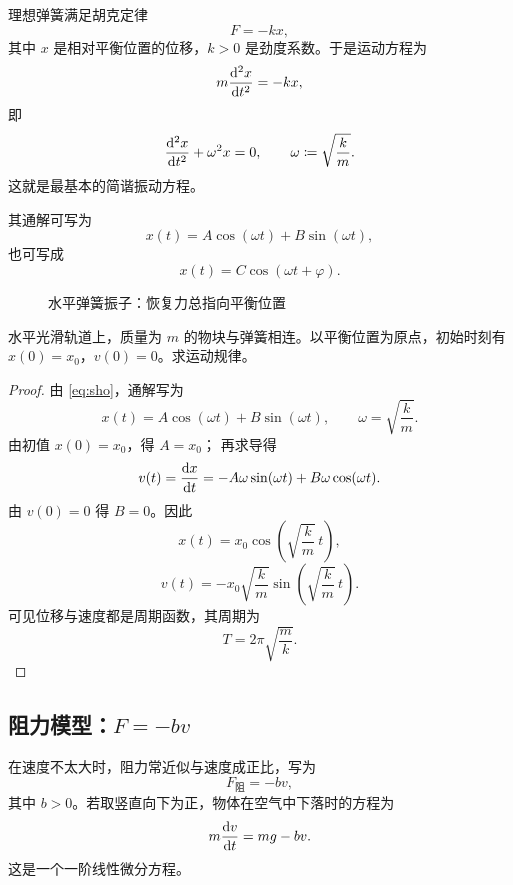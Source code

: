 理想弹簧满足胡克定律
\[
  F=-kx,
\]
其中 $x$ 是相对平衡位置的位移，$k>0$ 是劲度系数。于是运动方程为
\[
  m\dv[2]{x}{t}=-kx,
\]
即
\begin{equation}
  \dv[2]{x}{t}+\omega^2 x=0,
  \qquad \omega\coloneqq\sqrt{\frac{k}{m}}.
  \label{eq:sho}
\end{equation}
这就是最基本的简谐振动方程。

其通解可写为
\[
  x(t)=A\cos(\omega t)+B\sin(\omega t),
\]
也可写成
\[
  x(t)=C\cos(\omega t+\varphi).
\]

\begin{figure}[H]
  \centering
  \caption{水平弹簧振子：恢复力总指向平衡位置}
\end{figure}

\begin{example}[弹簧振子的初值问题]
水平光滑轨道上，质量为 $m$ 的物块与弹簧相连。以平衡位置为原点，初始时刻有 $x(0)=x_0$，$v(0)=0$。求运动规律。
\end{example}

\begin{proof}
由 \cref{eq:sho}，通解写为
\[
  x(t)=A\cos(\omega t)+B\sin(\omega t),\qquad \omega=\sqrt{\frac{k}{m}}.
\]
由初值 $x(0)=x_0$，得 $A=x_0$；
再求导得
\[
  v(t)=\dv{x}{t}=-A\omega\sin(\omega t)+B\omega\cos(\omega t).
\]
由 $v(0)=0$ 得 $B=0$。因此
\[
  x(t)=x_0\cos\left(\sqrt{\frac{k}{m}}\,t\right),
\]
\[
  v(t)=-x_0\sqrt{\frac{k}{m}}\sin\left(\sqrt{\frac{k}{m}}\,t\right).
\]
可见位移与速度都是周期函数，其周期为
\[
  T=2\pi\sqrt{\frac{m}{k}}.
\]
\end{proof}

\subsection{阻力模型：$F=-bv$}

在速度不太大时，阻力常近似与速度成正比，写为
\[
  F_{\text{阻}}=-bv,
\]
其中 $b>0$。若取竖直向下为正，物体在空气中下落时的方程为
\[
  m\dv{v}{t}=mg-bv.
\]
这是一个一阶线性微分方程。

